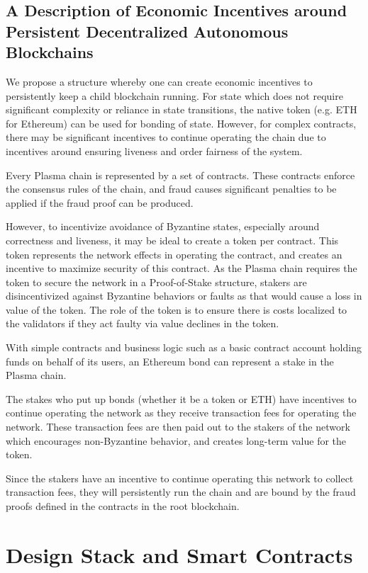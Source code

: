 \documentclass[letterpaper, 11pt]{article}
\begin{document}
\subsection{A Description of Economic Incentives around Persistent Decentralized
Autonomous Blockchains}

We propose a structure whereby one can create economic incentives to
persistently keep a child blockchain running. For state which does not require
significant complexity or reliance in state transitions, the native token (e.g.
ETH for Ethereum) can be used for bonding of state. However, for complex
contracts, there may be significant incentives to continue operating the chain
due to incentives around ensuring liveness and order fairness of the
system\cite{fredblog}\cite{navalblog}.

Every Plasma chain is represented by a set of contracts. These contracts enforce
the consensus rules of the chain, and fraud causes significant penalties to be
applied if the fraud proof can be produced.

However, to incentivize avoidance of Byzantine states, especially around
correctness and liveness, it may be ideal to create a token per contract. This
token represents the network effects in operating the contract, and creates an
incentive to maximize security of this contract. As the Plasma chain requires
the token to secure the network in a Proof-of-Stake structure, stakers are
disincentivized against Byzantine behaviors or faults as that would cause a loss
in value of the token. The role of the token is to ensure there is costs
localized to the validators if they act faulty via value declines in the token.

With simple contracts and business logic such as a basic contract account
holding funds on behalf of its users, an Ethereum bond can represent a stake in
the Plasma chain.

The stakes who put up bonds (whether it be a token or ETH) have incentives to
continue operating the network as they receive transaction fees for operating
the network. These transaction fees are then paid out to the stakers of the
network which encourages non-Byzantine behavior, and creates long-term value for
the token.

Since the stakers have an incentive to continue operating this network to
collect transaction fees, they will persistently run the chain and are bound by
the fraud proofs defined in the contracts in the root blockchain.

\section{Design Stack and Smart Contracts}
\end{document}
